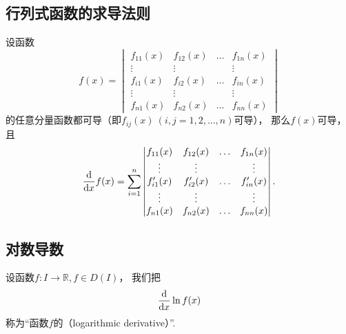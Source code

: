 \subsection{行列式函数的求导法则}
\begin{theorem}
\def\f#1{f_{#1}(x)}%
\def\g#1{f_{#1}'(x)}%
设函数\begin{equation*}
	f(x) = \begin{vmatrix}
		\f{11} & \f{12} & \dots & \f{1n} \\
		\vdots & \vdots & & \vdots \\
		\f{i1} & \f{i2} & \dots & \f{in} \\
		\vdots & \vdots & & \vdots \\
		\f{n1} & \f{n2} & \dots & \f{nn}
	\end{vmatrix}
\end{equation*}的任意分量函数都可导（即\(\f{ij}\ (i,j=1,2,\dotsc,n)\)可导），
那么\(f(x)\)可导，
且\begin{equation*}
	\dv{x} f(x)
	= \sum_{i=1}^n \begin{vmatrix}
		\f{11} & \f{12} & \dots & \f{1n} \\
		\vdots & \vdots & & \vdots \\
		\g{i1} & \g{i2} & \dots & \g{in} \\
		\vdots & \vdots & & \vdots \\
		\f{n1} & \f{n2} & \dots & \f{nn}
	\end{vmatrix}.
\end{equation*}
\end{theorem}

\subsection{对数导数}
\begin{definition}
设函数\(f\colon I \to \mathbb{R}, f \in D(I)\)，
我们把\begin{equation*}
	\dv{x} \ln f(x)
\end{equation*}称为“函数\(f\)的（logarithmic derivative）”.
\end{definition}
